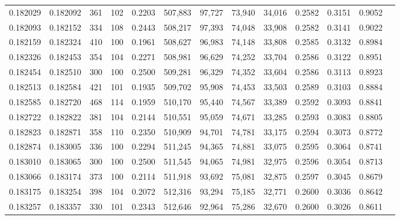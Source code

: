 \begin{tabular}{rrrrrrrrrrrrr}
0.182029 & 0.182092 &   361 & 102 &                                     0.2203 & 507,883 &  97,727 &  73,940 &  34,016 & 0.2582 & 0.3151 & 0.9052 \\
0.182093 & 0.182152 &   334 & 108 &                                     0.2443 & 508,217 &  97,393 &  74,048 &  33,908 & 0.2582 & 0.3141 & 0.9022 \\
0.182159 & 0.182324 &   410 & 100 &                                     0.1961 & 508,627 &  96,983 &  74,148 &  33,808 & 0.2585 & 0.3132 & 0.8984 \\
0.182326 & 0.182453 &   354 & 104 &                                     0.2271 & 508,981 &  96,629 &  74,252 &  33,704 & 0.2586 & 0.3122 & 0.8951 \\
0.182454 & 0.182510 &   300 & 100 &                                     0.2500 & 509,281 &  96,329 &  74,352 &  33,604 & 0.2586 & 0.3113 & 0.8923 \\
0.182513 & 0.182584 &   421 & 101 &                                     0.1935 & 509,702 &  95,908 &  74,453 &  33,503 & 0.2589 & 0.3103 & 0.8884 \\
0.182585 & 0.182720 &   468 & 114 &                                     0.1959 & 510,170 &  95,440 &  74,567 &  33,389 & 0.2592 & 0.3093 & 0.8841 \\
0.182722 & 0.182822 &   381 & 104 &                                     0.2144 & 510,551 &  95,059 &  74,671 &  33,285 & 0.2593 & 0.3083 & 0.8805 \\
0.182823 & 0.182871 &   358 & 110 &                                     0.2350 & 510,909 &  94,701 &  74,781 &  33,175 & 0.2594 & 0.3073 & 0.8772 \\
0.182874 & 0.183005 &   336 & 100 &                                     0.2294 & 511,245 &  94,365 &  74,881 &  33,075 & 0.2595 & 0.3064 & 0.8741 \\
0.183010 & 0.183065 &   300 & 100 &                                     0.2500 & 511,545 &  94,065 &  74,981 &  32,975 & 0.2596 & 0.3054 & 0.8713 \\
0.183066 & 0.183174 &   373 & 100 &                                     0.2114 & 511,918 &  93,692 &  75,081 &  32,875 & 0.2597 & 0.3045 & 0.8679 \\
0.183175 & 0.183254 &   398 & 104 &                                     0.2072 & 512,316 &  93,294 &  75,185 &  32,771 & 0.2600 & 0.3036 & 0.8642 \\
0.183257 & 0.183357 &   330 & 101 &                                     0.2343 & 512,646 &  92,964 &  75,286 &  32,670 & 0.2600 & 0.3026 & 0.8611 \\

\end{tabular}
